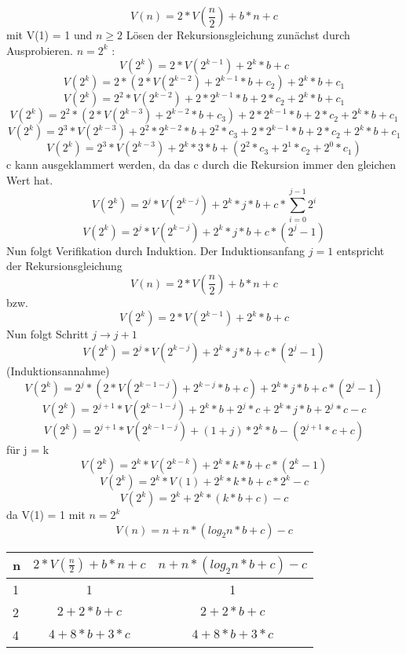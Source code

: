 \documentclass{article}
\begin{document}
\[V(n) = 2* V\left(\frac{n}{2}\right)+ b*n +c \] mit V(1) = 1 und $n \geq 2$
\newline
Lösen der Rekursionsgleichung zunächst durch Ausprobieren.
$n = 2^k$ : \[V(2^k) = 2* V\left(2^{k-1}\right)+  2^k*b +c \] 
\[V(2^k) = 2* \left(2*V\left(2^{k-2}\right)+2^{k-1}*b+c_2\right )+  2^k*b +c_1 \] 
\[V(2^k) = 2^2*V\left(2^{k-2}\right)+2*2^{k-1}*b+2*c_2+  2^k*b +c_1 \] 
\[V(2^k) = 2^2*\left(2*V\left(2^{k-3}\right)+2^{k-2}*b+c_3\right)+2*2^{k-1}*b+2*c_2+  2^k*b +c_1 \] 
\[V(2^k) = 2^3*V\left(2^{k-3}\right)+2^2*2^{k-2}*b+2^2*c_3+2*2^{k-1}*b+2*c_2+  2^k*b +c_1 \] 
\[V(2^k) = 2^3*V\left(2^{k-3}\right)+2^{k}*3*b+(2^2*c_3+2^1*c_2+ 2^0*c_1) \] 
\newline
c kann ausgeklammert werden, da das c durch die Rekursion immer den gleichen Wert hat.
\[V(2^k) = 2^j*V\left(2^{k-j}\right)+2^{k}*j*b+ c*\sum_{i=0}^{j-1}{2^i} \] 
\[V(2^k) = 2^j*V\left(2^{k-j}\right)+2^{k}*j*b+ c*(2^j-1) \] 
\newline
Nun folgt Verifikation durch Induktion.
Der Induktionsanfang $j=1$ entspricht der Rekursionsgleichung
\[V(n) = 2* V\left(\frac{n}{2}\right)+ b*n +c \]
bzw.
 \[V(2^k) = 2* V\left(2^{k-1}\right)+  2^k*b +c \] 
 Nun folgt Schritt $j \rightarrow j+1$
\[V(2^k) = 2^j*V\left(2^{k-j}\right)+2^{k}*j*b+ c*(2^j-1) \] (Induktionsannahme)
\[V(2^k) = 2^j*\left(2* V\left(2^{k-1-j}\right)+  2^{k-j}*b +c\right)+2^{k}*j*b+ c*(2^j-1) \] 
\[V(2^k) = 2^{j+1}*V\left(2^{k-1-j}\right)+2^{k}*b +2^j*c+2^k*j*b+2^j*c-c \] 
\[V(2^k) = 2^{j+1}*V\left(2^{k-1-j}\right)+(1+j)*2^k*b-(2^{j+1}*c+c)\] 
\newline
für j = k
\[V(2^k) = 2^k*V\left(2^{k-k}\right)+2^{k}*k*b+ c*(2^k-1) \] 
\[V(2^k) = 2^k*V\left(1\right)+2^{k}*k*b+ c*2^k-c \] 
\[V(2^k) = 2^k+2^{k}*(k*b+ c)-c \]  da V(1) = 1
\newline mit $n=2^k$
\[V(n) = n+n*(log_2n*b+ c)-c \] 
\newline
\begin{center}
\begin{tabular}[h]{l|c|c}
n & $2* V\left(\frac{n}{2}\right)+ b*n +c$ & $ n+n*(log_2n*b+ c)-c$ \\
\hline
1 & 1 & 1 \\
\hline
2 & $2+2*b+c$ & $2+2*b+c$ \\
\hline
4 & $4+8*b+3*c$ & $4+8*b+3*c$ \\
\end{tabular}
\end{center}
\end{document}
